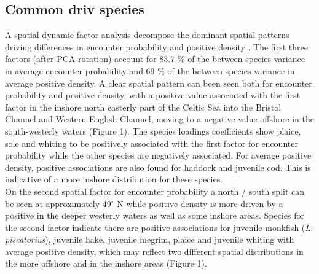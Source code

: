 \documentclass[fleqn,10pt]{wlscirep}
\begin{document}
\begin{linenumbers}
\subsection*{Common  driv species \\} A spatial dynamic factor
analysis  decompose the dominant
spatial patterns driving differences in encounter probability
 and positive density .  The first
three factors (after PCA rotation) account for 83.7 \% of the between species
variance in average encounter probability and 69 \% of the between species
variance in average positive density. A clear spatial pattern can been seen
both for  encounter probability and
 positive density, with a positive
 value associated with the first factor in the
inshore north easterly part of the Celtic Sea into the Bristol Channel and
Western English Channel, moving to a negative  value
offshore in the south-westerly waters (Figure 1).  The species loadings
coefficients show plaice, sole and whiting to be positively associated with the
first factor for  encounter probability while the other
species are negatively associated. For average positive density, positive
associations are also found for haddock and juvenile cod. This is indicative of
a more inshore distribution for these species.\\ 

On the second spatial factor for  encounter probability a
north / south split can be seen at approximately 49$^{\circ}$ N while positive
density is more driven by a positive  in
the deeper westerly waters as well as some inshore areas. Species
 for the second factor indicate there are
positive associations for juvenile monkfish (\emph{L.  piscatorius}), juvenile
hake, juvenile megrim, plaice and juvenile whiting with average positive
density, which may reflect two different spatial distributions in the more
offshore and in the inshore areas (Figure 1).\\


\end{linenumbers}
\end{document}
